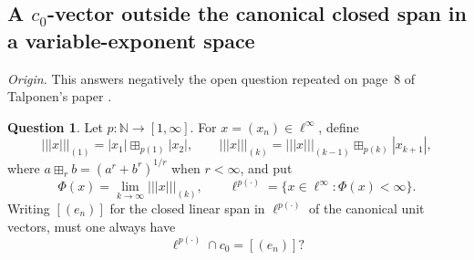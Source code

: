 \documentclass[11pt,reqno]{amsart}
\theoremstyle{plain}
\theoremstyle{definition}
\newtheorem{question}[question]{Question}
\begin{document}
\subsection{A \texorpdfstring{$c_0$}{c0}-vector outside the canonical closed span in a variable-exponent space}
\label{sec:selected-variable-exponent}

\noindent\textit{Origin.} This answers negatively the open question repeated on page~8 of Talponen's paper \cite{Talponen2009SequentialSpaces}.

\begin{question}
Let $p\colon\mathbb N\to[1,\infty]$. For $x=(x_n)\in\ell^\infty$, define
\begin{equation*}
    \lvert\!\lvert\!\lvert  x\rvert\!\rvert\!\rvert_{(1)}=|x_1|\boxplus_{p(1)}|x_2|, \qquad \lvert\!\lvert\!\lvert x\rvert\!\rvert\!\rvert_{(k)}    =\lvert\!\lvert\!\lvert x\rvert\!\rvert\!\rvert_{(k-1)}\boxplus_{p(k)}|x_{k+1}|,
\end{equation*}
where $a\boxplus_r b=(a^r+b^r)^{1/r}$ when $r<\infty$, and put
\begin{equation*}
 \Phi(x)=\lim_{k\to\infty} \lvert\!\lvert\!\lvert x\rvert\!\rvert\!\rvert_{(k)}, \qquad \ell^{p(\cdot)}=\{x\in\ell^\infty:\Phi(x)<\infty\}.
\end{equation*}
Writing $[(e_n)]$ for the closed linear span in $\ell^{p(\cdot)}$ of the canonical unit vectors, must one always have
\begin{equation*}
 \ell^{p(\cdot)}\cap c_0=[(e_n)]?
\end{equation*}
\end{question}
\end{document}
